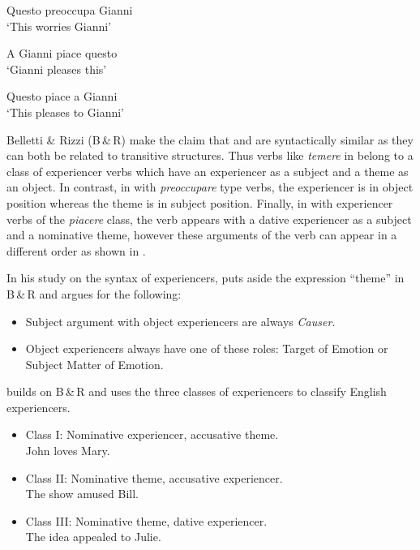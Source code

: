 \documentclass[output=paper]{langscibook}
\begin{document}
\ex \label{ex:tamba:3b}
 Questo preoccupa Gianni\\
\glt `This worries Gianni'

\ex \label{ex:tamba:3c}
 A Gianni piace questo\\
\glt `Gianni pleases this'

\ex \label{ex:tamba:3d}
 Questo piace a Gianni\\
\glt `This pleases to Gianni'
\z
\z 

Belletti \& Rizzi (B\,\&\,R) make the claim that  and  are  syntactically similar as they can both be related to transitive structures.  Thus verbs like \textit{temere} in   belong to a class of  experiencer verbs which have an experiencer as a subject and a theme as an object. In contrast, in  with \textit{preoccupare} type verbs, the experiencer is in object position whereas the theme is in subject position.  Finally, in  with experiencer verbs of the \textit{piacere} class, the verb appears with a dative experiencer as a subject and a nominative theme, however these arguments of the verb can appear in a different order as shown in . 

In his study on the syntax of experiencers, \citet{Pesetsky1995} puts aside the expression “theme” in B\,\&\,R  and argues for the following: 

\begin{itemize}
\item Subject argument with object experiencers are always \textit{Causer.}
\item Object experiencers always have one of these roles: Target of Emotion or Subject Matter of Emotion.
\end{itemize}


\citet[3]{Landau2010} builds on B\,\&\,R and uses the three classes of experiencers to classify English experiencers.  

\begin{itemize}
\item Class I: Nominative experiencer, accusative theme.\\
John loves Mary.

\item Class II: Nominative theme, accusative experiencer.\\
The show amused Bill.

\item Class III: Nominative theme, dative experiencer.\\
The idea appealed to Julie.
\end{itemize}
\end{document}
